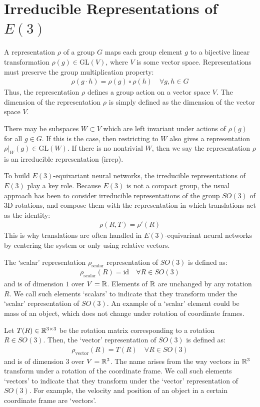 \section{Irreducible Representations of $E(3)$}
\label{sec:irreps}

A representation $\rho$ of a group $G$ maps each group element $g$ to a bijective linear transformation $\rho(g) \in \mathrm{GL}(V)$, where $V$ is some vector space. 
Representations must preserve the group multiplication property:
\begin{align}
\rho(g \cdot h) = \rho(g) \circ \rho(h) \quad \forall g, h \in G
\end{align}
Thus, the representation $\rho$ defines a group action on a vector space $V$. The dimension of the representation $\rho$ is simply defined as the dimension of the vector space $V$.

There may be subspaces $W\subset V$ which are left invariant under actions of $\rho(g)$ for all $g\in G$. If this is the case, then restricting to $W$ also gives a representation $\rho|_W(g)\in\mathrm{GL}(W)$. If there is no nontrivial $W$, then we say the representation $\rho$ is an irreducible representation (irrep).

To build $E(3)$-equivariant neural networks, the irreducible representations of $E(3)$ play a key role. Because $E(3)$ is not a compact group, the usual approach has been to consider irreducible representations of the group $SO(3)$ of 3D rotations, and compose them with the representation in which translations act as the identity:
\begin{align}
\rho(R, T) = \rho'(R)
\end{align}
This is why translations are often handled in $E(3)$-equivariant neural networks by centering the system or only using relative vectors.

 The `scalar' representation $\rho_{\text{scalar}}$ representation of $SO(3)$ is defined as:
\begin{align}
\rho_{\text{scalar}}(R) = \mathrm{id} \quad \forall R \in SO(3)
\end{align}
and is of dimension $1$ over $V = \mathbb{R}$. Elements of $\mathbb{R}$ are unchanged by any rotation $R$. We call such elements `scalars' to indicate that they transform under the `scalar' representation of $SO(3)$. An example of a `scalar' element could be mass of an object, which does not change under rotation of coordinate frames.

Let $T(R) \in \mathbb{R}^{3 \times 3}$ be the rotation matrix corresponding to a rotation $R \in SO(3)$.
Then, the `vector' representation of $SO(3)$ is defined as:
\begin{align}
\rho_{\text{vector}}(R) = T(R)
\quad \forall R \in SO(3)
\end{align}
and is of dimension $3$ over $V = \mathbb{R}^3$.
The name arises from the way vectors in $\mathbb{R}^3$ transform under a rotation of the coordinate frame.
We call such elements `vectors' to indicate that they transform under the `vector' representation of $SO(3)$. For example, the velocity and position of an object in a certain coordinate frame are `vectors'.
 
